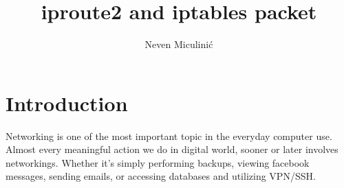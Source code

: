 \documentclass[times, utf8, seminar, english]{fer}
\begin{document}
\theoremstyle{definition}
\newtheorem{definition}{Definition}[section]
\title{iproute2 and iptables packet}
\author{Neven Miculini\'{c}}

\maketitle
\tableofcontents


\chapter{Introduction}

Networking is one of the most important topic in the everyday computer use. Almost every meaningful action we do in digital world, sooner or later involves networkings. Whether it's simply performing backups, viewing facebook messages, sending emails, or accessing databases and utilizing VPN/SSH.
\end{document}
